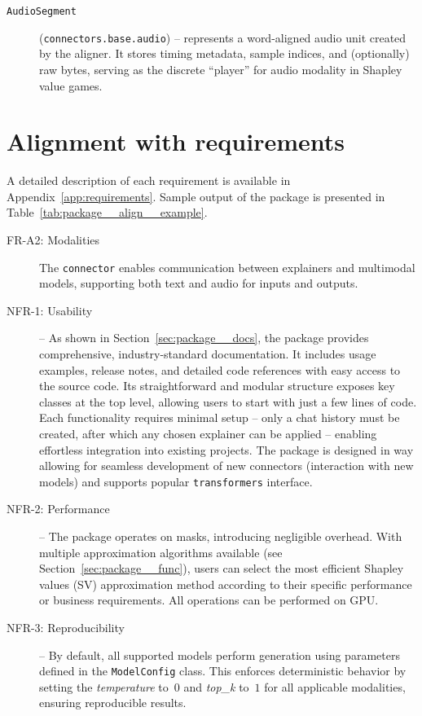 \begin{appendices}
\begin{description}
    \item[\texttt{AudioSegment}] (\texttt{connectors.base.audio}) -- represents a word-aligned audio unit created by the aligner. It stores timing metadata, sample indices, and (optionally) raw bytes, serving as the discrete ``player'' for audio modality in Shapley value games.
\end{description}

\section{Alignment with requirements}
\label{sec:package__align}

A detailed description of each requirement is available in Appendix~\ref{app:requirements}. Sample output of the package is presented in Table~\ref{tab:package__align__example}.

\begin{description}
    \item[FR-A2: Modalities] The \texttt{connector} enables communication between explainers and multimodal models, supporting both text and audio for inputs and outputs.

    \item[NFR-1: Usability] -- As shown in Section~\ref{sec:package__docs}, the package provides comprehensive, industry-standard documentation. It includes usage examples, release notes, and detailed code references with easy access to the source code. Its straightforward and modular structure exposes key classes at the top level, allowing users to start with just a few lines of code. Each functionality requires minimal setup -- only a chat history must be created, after which any chosen explainer can be applied -- enabling effortless integration into existing projects. The package is designed in way allowing for seamless development of new connectors (interaction with new models) and supports popular \texttt{transformers} interface.

    \item[NFR-2: Performance] – The package operates on masks, introducing negligible overhead. With multiple approximation algorithms available (see Section~\ref{sec:package__func}), users can select the most efficient Shapley values (SV) approximation method according to their specific performance or business requirements. All operations can be performed on GPU.

    \item[NFR-3: Reproducibility] -- By default, all supported models perform generation using parameters defined in the \texttt{ModelConfig} class. This enforces deterministic behavior by setting the \textit{temperature} to~$0$ and \textit{top\_k} to~$1$ for all applicable modalities, ensuring reproducible results.


\end{description}
\end{appendices}
